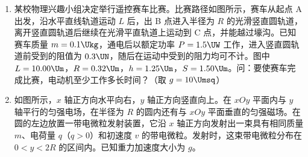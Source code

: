 \documentclass[\gkver]{gaokaozhenti}
\begin{document}
\begin{enumerate}
{（2）小物块与 A 板相碰后以 $v_{1}$ 大小相等的速度反弹，因为电荷量及电性改变，电场力大小与方向发生变化，摩擦力的方向发生改变，小物块所受的合外力大小为 $F_{\text{合}}=\mu mg-\frac{qE}{2}$，加速度大小为 $a_{2}=\frac{F_{\text{合}}}{m}=\frac{1}{4}\mu g$。设小物块碰后到停止的时间为 $t$，注意到末速度为零，有 $0-v_{1}=-a_{2}t$，解得 $t=\frac{v_{1}}{a_{2}}=4\sqrt{\frac{l}{\mu g}}$。设小物块碰后停止时距离为 $x$，注意到末速度为零，有 $0-v_{1}^{2}=-2a_{2}x$，则 $x=\frac{v_{1}^{2}}{2a_{2}}=2l$，或距离 B 板为 $d-2l$。
}

\item
某校物理兴趣小组决定举行遥控赛车比赛。比赛路径如图所示，赛车从起点 A 出发，沿水平直线轨道运动 $L$ 后，出 B 点进入半径为 $R$ 的光滑竖直圆轨道，离开竖直圆轨道后继续在光滑平直轨道上运动到 C 点，并能越过壕沟。已知赛车质量 $m=0.1\Ukg$，通电后以额定功率 $P=1.5\UW$ 工作，进入竖直圆轨道前受到的阻值为 $0.3\UN$，随后在运动中受到的阻力均可不计。图中 $L=10.00\Um$，$R=0.32\Um$，$h=1.25\Um$，$S=1.50\Um$。问：要使赛车完成比赛，电动机至少工作多长时间？（取 $g=10\Umsq$）


\jdanswer{$2.53\Us$}


\item
如图所示，$x$ 轴正方向水平向右，$y$ 轴正方向竖直向上。在 $xOy$ 平面内与 $y$ 轴平行的匀强电场，在半径为 $R$ 的圆内还有与 $xOy$ 平面垂直的匀强磁场。在圆的左边放置一带电微粒发射装置，它沿 $x$ 轴正方向发射出一束具有相同质量 $m$、电荷量 $q$（$q>0$）和初速度 $v$ 的带电微粒。发射时，这束带电微粒分布在 $0<y<2R$ 的区间内。已知重力加速度大小为 $g$。


\end{enumerate}
\end{document}
